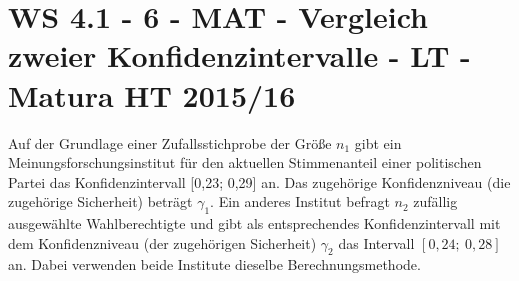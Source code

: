 \section{WS 4.1 - 6 - MAT - Vergleich zweier Konfidenzintervalle - LT - Matura HT 2015/16}

\begin{beispiel}[WS 4.1]{1} %
Auf der Grundlage einer Zufallsstichprobe der Größe $n_1$ gibt ein Meinungsforschungsinstitut für den aktuellen Stimmenanteil einer politischen Partei das Konfidenzintervall [0,23; 0,29] an. Das zugehörige Konfidenzniveau (die zugehörige Sicherheit) beträgt $\gamma_1$.
Ein anderes Institut befragt $n_2$ zufällig ausgewählte Wahlberechtigte und gibt als entsprechendes Konfidenzintervall mit dem Konfidenzniveau (der zugehörigen Sicherheit) $\gamma_2$ das Intervall $[0,24;~0,28]$ an. Dabei verwenden beide Institute dieselbe Berechnungsmethode.
\leer

\end{beispiel}